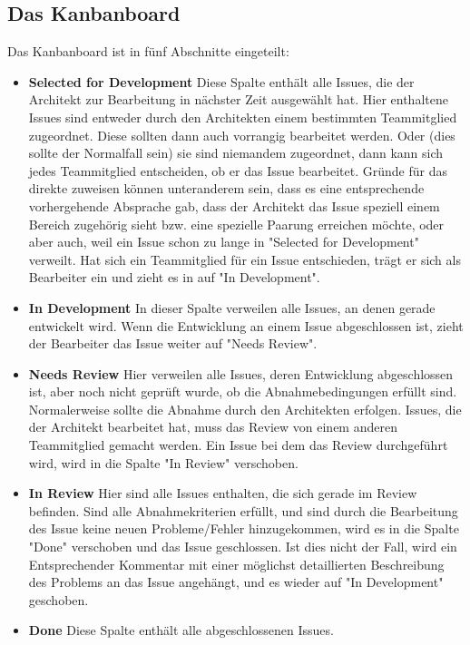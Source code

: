 \subsection{Das Kanbanboard}
Das Kanbanboard ist in fünf Abschnitte eingeteilt: 
\begin{itemize}
	\item \textbf{Selected for Development} \newline
	Diese Spalte enthält alle Issues, die der Architekt zur Bearbeitung in nächster Zeit ausgewählt hat. Hier enthaltene Issues sind entweder durch den Architekten einem bestimmten Teammitglied zugeordnet. Diese sollten dann auch vorrangig bearbeitet werden. Oder (dies sollte der Normalfall sein) sie sind niemandem zugeordnet, dann kann sich jedes Teammitglied entscheiden, ob er das Issue bearbeitet. Gründe für das direkte zuweisen können unteranderem sein, dass es eine entsprechende vorhergehende Absprache gab, dass der Architekt das Issue speziell einem Bereich zugehörig sieht bzw. eine spezielle Paarung erreichen möchte, oder aber auch, weil ein Issue schon zu lange in "Selected for Development" verweilt. Hat sich ein Teammitglied für ein Issue entschieden, trägt er sich als Bearbeiter ein und zieht es in auf "In Development".
	\item \textbf{In Development} \newline
	In dieser Spalte verweilen alle Issues, an denen gerade entwickelt wird. Wenn die Entwicklung an einem Issue abgeschlossen ist, zieht der Bearbeiter das Issue weiter auf "Needs Review".
	\item \textbf{Needs Review} \newline
	Hier verweilen alle Issues, deren Entwicklung abgeschlossen ist, aber noch nicht geprüft wurde, ob die Abnahmebedingungen erfüllt sind. Normalerweise sollte die Abnahme durch den Architekten erfolgen. Issues, die der Architekt bearbeitet hat, muss das Review von einem anderen Teammitglied gemacht werden. Ein Issue bei dem das Review durchgeführt wird, wird in die Spalte "In Review" verschoben.
	\item \textbf{In Review} \newline
	Hier sind alle Issues enthalten, die sich gerade im Review befinden. Sind alle Abnahmekriterien erfüllt, und sind durch die Bearbeitung des Issue keine neuen Probleme/Fehler hinzugekommen, wird es in die Spalte "Done" verschoben und das Issue geschlossen. Ist dies nicht der Fall, wird ein Entsprechender Kommentar mit einer möglichst detaillierten Beschreibung des Problems an das Issue angehängt, und es wieder auf "In Development" geschoben. 
	\item \textbf{Done} \newline
	Diese Spalte enthält alle abgeschlossenen Issues.
\end{itemize}

